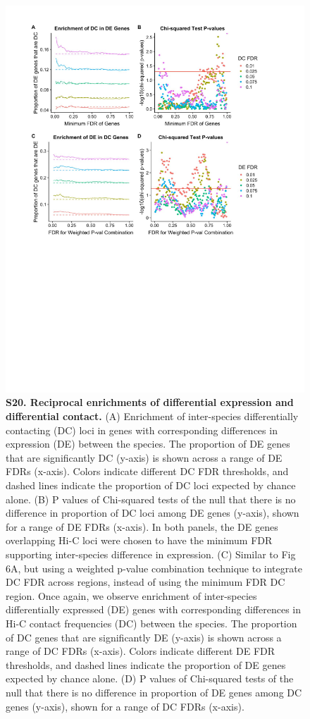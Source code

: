 \begin{figure}[!htb]
\centering
\includegraphics[width=6in]{img/figS20.pdf}
\caption[Reciprocal enrichments of differential expression and differential contact.]{\textbf{S20. Reciprocal enrichments of differential expression and differential contact.} (A) Enrichment of inter-species differentially contacting (DC) loci in genes with corresponding differences in expression (DE) between the species. The proportion of DE genes that are significantly DC (y-axis) is shown across a range of DE FDRs (x-axis). Colors indicate different DC FDR thresholds, and dashed lines indicate the proportion of DC loci expected by chance alone. (B) P values of Chi-squared tests of the null that there is no difference in proportion of DC loci among DE genes (y-axis), shown for a range of DE FDRs (x-axis). In both panels, the DE genes overlapping Hi-C loci were chosen to have the minimum FDR supporting inter-species difference in expression. (C) Similar to Fig 6A, but using a weighted p-value combination technique \cite{Whitlock.2005} to integrate DC FDR across regions, instead of using the minimum FDR DC region. Once again, we observe enrichment of inter-species differentially expressed (DE) genes with corresponding differences in Hi-C contact frequencies (DC) between the species. The proportion of DC genes that are significantly DE (y-axis) is shown across a range of DC FDRs (x-axis). Colors indicate different DE FDR thresholds, and dashed lines indicate the proportion of DE genes expected by chance alone. (D) P values of Chi-squared tests of the null that there is no difference in proportion of DE genes among DC genes (y-axis), shown for a range of DC FDRs (x-axis).}
\label{fig:ch02-figS20}
\end{figure}

